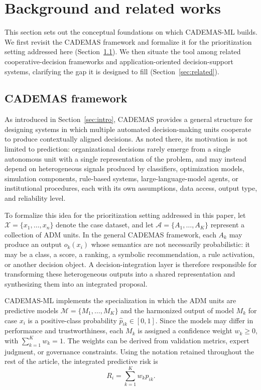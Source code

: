 \documentclass{interact}
\begin{document}
\section{Background and related works}\label{sec:background}

This section sets out the conceptual foundations on which CADEMAS-ML builds. We first revisit the CADEMAS framework and formalize it for the prioritization setting addressed here (Section~\ref{sec:cademas}). We then situate the tool among related cooperative-decision frameworks and application-oriented decision-support systems, clarifying the gap it is designed to fill (Section~\ref{sec:related}).

\subsection{CADEMAS framework}\label{sec:cademas}

As introduced in Section~\ref{sec:intro}, CADEMAS \citep{NovoaHernandez2026} provides a general structure for designing systems in which multiple automated decision-making units cooperate to produce contextually aligned decisions. As noted there, its motivation is not limited to prediction: organizational decisions rarely emerge from a single autonomous unit with a single representation of the problem, and may instead depend on heterogeneous signals produced by classifiers, optimization models, simulation components, rule-based systems, large-language-model agents, or institutional procedures, each with its own assumptions, data access, output type, and reliability level.

To formalize this idea for the prioritization setting addressed in this paper, let $\mathcal{X} = \{x_1, \dots, x_n\}$ denote the case dataset, and let $\mathcal{A} = \{A_1, \dots, A_K\}$ represent a collection of ADM units. In the general CADEMAS framework, each $A_k$ may produce an output $o_k(x_i)$ whose semantics are not necessarily probabilistic: it may be a class, a score, a ranking, a symbolic recommendation, a rule activation, or another decision object. A decision-integration layer is therefore responsible for transforming these heterogeneous outputs into a shared representation and synthesizing them into an integrated proposal.

CADEMAS-ML implements the specialization in which the ADM units are predictive models $\mathcal{M}=\{M_1,\ldots,M_K\}$ and the harmonized output of model $M_k$ for case $x_i$ is a positive-class probability $\hat{p}_{ik}\in[0,1]$. Since the models may differ in performance and trustworthiness, each $M_k$ is assigned a confidence weight $w_k\geq0$, with $\sum_{k=1}^{K}w_k=1$. The weights can be derived from validation metrics, expert judgment, or governance constraints. Using the notation retained throughout the rest of the article, the integrated predictive risk is
\begin{equation}
R_i = \sum_{k=1}^{K} w_k \hat{p}_{ik}.
\end{equation}
\end{document}
